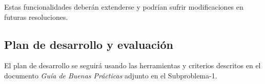 \documentclass[12pt]{article}
\theoremstyle{definition}
\begin{document}
Estas funcionalidades deberán extenderse y podrían sufrir modificaciones en futuras resoluciones.

\subsection*{Plan de desarrollo y evaluación}

El plan de desarrollo se seguirá usando las herramientas y criterios descritos en el documento \textit{Guía de Buenas Prácticas} adjunto en el Subproblema-1.
\end{document}
